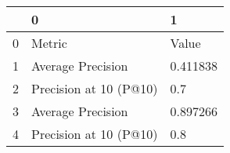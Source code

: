 \begin{tabular}{lll}
\toprule
{} &                       0 &         1 \\
\midrule
0 &                  Metric &     Value \\
1 &       Average Precision &  0.411838 \\
2 &  Precision at 10 (P@10) &       0.7 \\
3 &       Average Precision &  0.897266 \\
4 &  Precision at 10 (P@10) &       0.8 \\
\bottomrule
\end{tabular}
